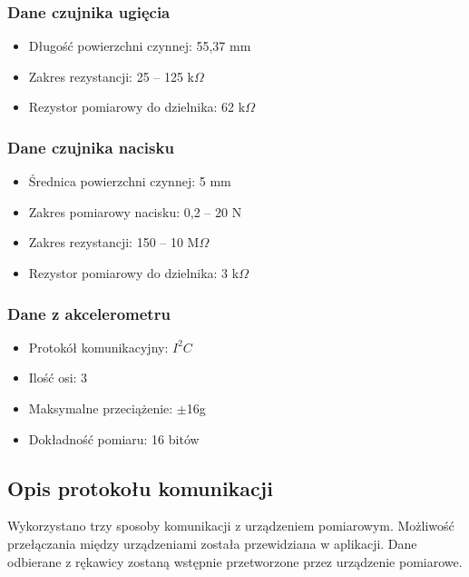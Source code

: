 \documentclass[10pt,a4paper]{article}
\begin{document}
\subsubsection{Dane czujnika ugięcia}
\begin{itemize}
\item Długość powierzchni czynnej: 55,37 mm
\item Zakres rezystancji: 25 -- 125 k$\Omega$
\item Rezystor pomiarowy do dzielnika: 62 k$\Omega$
\end{itemize}
\subsubsection{Dane czujnika nacisku}
\begin{itemize}
\item Średnica powierzchni czynnej: 5 mm
\item Zakres pomiarowy nacisku: 0,2 -- 20 N
\item Zakres rezystancji: 150 -- 10 M$\Omega$
\item Rezystor pomiarowy do dzielnika: 3 k$\Omega$
\end{itemize}
\subsubsection{Dane z akcelerometru}
\begin{itemize}
\item Protokół komunikacyjny: $I^2C$
\item Ilość osi: 3
\item Maksymalne przeciążenie: $\pm$16g
\item Dokładność pomiaru: 16 bitów 
\end{itemize}

\subsection{Opis protokołu komunikacji}
Wykorzystano trzy sposoby komunikacji z urządzeniem pomiarowym. Możliwość przełączania między urządzeniami została przewidziana w aplikacji. Dane odbierane z rękawicy zostaną wstępnie przetworzone przez urządzenie pomiarowe.\\
\end{document}
